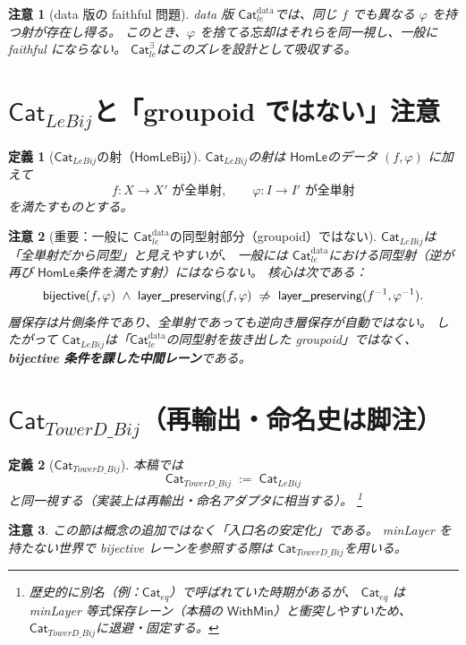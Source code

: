 \documentclass[a4paper,12pt]{ltjsarticle}
\newtheorem{definition}{定義}[section]
\newtheorem{remark}{注意}[section]
\newcommand{\HomLe}{\ensuremath{\mathsf{HomLe}}}
\newcommand{\HomLeBij}{\ensuremath{\mathsf{HomLeBij}}}
\newcommand{\Catledata}{\ensuremath{\mathsf{Cat}_{le}^{\text{data}}}}
\newcommand{\Catleexists}{\ensuremath{\mathsf{Cat}_{le}^{\exists}}}
\newcommand{\CatLeBij}{\ensuremath{\mathsf{Cat}_{LeBij}}}
\newcommand{\CatTowerDBij}{\ensuremath{\mathsf{Cat}_{TowerD\_Bij}}}
\newcommand{\WithMin}{\ensuremath{\mathsf{WithMin}}}
\newcommand{\Cateq}{\ensuremath{\mathsf{Cat}_{eq}}}
\begin{document}
\begin{remark}[data 版の faithful 問題]
data 版 \Catledata では、同じ \(f\) でも異なる \(\varphi\) を持つ射が存在し得る。
このとき、\(\varphi\) を捨てる忘却はそれらを同一視し、一般に faithful にならない。
\Catleexists はこのズレを設計として吸収する。
\end{remark}

\section{\CatLeBij と「groupoid ではない」注意}\label{sec:CatLeBij}

\begin{definition}[\CatLeBij の射（\HomLeBij）]
\CatLeBij の射は \HomLe のデータ \((f,\varphi)\) に加えて
\[
f:X\to X' \text{ が全単射},\qquad \varphi:I\to I' \text{ が全単射}
\]
を満たすものとする。
\end{definition}

\begin{remark}[重要：一般に \Catledata の同型射部分（groupoid）ではない]
\CatLeBij は「全単射だから同型」と見えやすいが、
一般には \Catledata における同型射（逆が再び \HomLe 条件を満たす射）にはならない。
核心は次である：
\[
\textsf{bijective}(f,\varphi)\ \wedge\ \textsf{layer\_preserving}(f,\varphi)
\;\centernot\Rightarrow\;
\textsf{layer\_preserving}(f^{-1},\varphi^{-1}).
\]
層保存は片側条件であり、全単射であっても逆向き層保存が自動ではない。
したがって \CatLeBij は「\Catledata の同型射を抜き出した groupoid」ではなく、
\textbf{bijective 条件を課した中間レーン}である。
\end{remark}

\section{\CatTowerDBij（再輸出・命名史は脚注）}

\begin{definition}[\CatTowerDBij]
本稿では
\[
\CatTowerDBij \;:=\; \CatLeBij
\]
と同一視する（実装上は再輸出・命名アダプタに相当する）。%
\footnote{%
歴史的に別名（例：\(\Cateq\)）で呼ばれていた時期があるが、
\(\Cateq\) は minLayer 等式保存レーン（本稿の \WithMin）と衝突しやすいため、
\CatTowerDBij に退避・固定する。}
\end{definition}

\begin{remark}
この節は概念の追加ではなく「入口名の安定化」である。
minLayer を持たない世界で bijective レーンを参照する際は \CatTowerDBij を用いる。
\end{remark}
\end{document}
